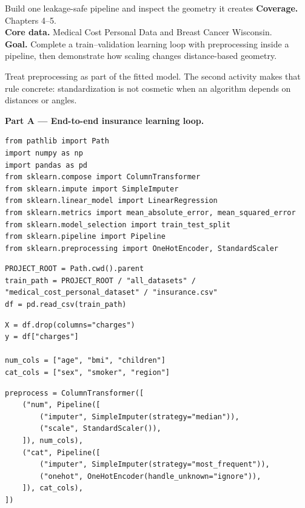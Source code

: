 
\begin{labproject}{Build one leakage-safe pipeline and inspect the geometry it creates}
\textbf{Coverage.} Chapters 4--5.\\
\textbf{Core data.} Medical Cost Personal Data and Breast Cancer Wisconsin.\\
\textbf{Goal.} Complete a train--validation learning loop with preprocessing inside a pipeline, then demonstrate how scaling changes distance-based geometry.

\begin{labmode}
Treat preprocessing as part of the fitted model. The second activity makes that rule concrete: standardization is not cosmetic when an algorithm depends on distances or angles.
\end{labmode}

\medskip\noindent\textbf{Part A --- End-to-end insurance learning loop.}\par
\begin{lstlisting}[style=mlpython]
from pathlib import Path
import numpy as np
import pandas as pd
from sklearn.compose import ColumnTransformer
from sklearn.impute import SimpleImputer
from sklearn.linear_model import LinearRegression
from sklearn.metrics import mean_absolute_error, mean_squared_error
from sklearn.model_selection import train_test_split
from sklearn.pipeline import Pipeline
from sklearn.preprocessing import OneHotEncoder, StandardScaler
\end{lstlisting}

\begin{lstlisting}[style=mlpython]
PROJECT_ROOT = Path.cwd().parent
train_path = PROJECT_ROOT / "all_datasets" / "medical_cost_personal_dataset" / "insurance.csv"
df = pd.read_csv(train_path)
\end{lstlisting}

\begin{lstlisting}[style=mlpython]
X = df.drop(columns="charges")
y = df["charges"]

num_cols = ["age", "bmi", "children"]
cat_cols = ["sex", "smoker", "region"]
\end{lstlisting}

\begin{lstlisting}[style=mlpython]
preprocess = ColumnTransformer([
    ("num", Pipeline([
        ("imputer", SimpleImputer(strategy="median")),
        ("scale", StandardScaler()),
    ]), num_cols),
    ("cat", Pipeline([
        ("imputer", SimpleImputer(strategy="most_frequent")),
        ("onehot", OneHotEncoder(handle_unknown="ignore")),
    ]), cat_cols),
])
\end{lstlisting}


\end{labproject}
